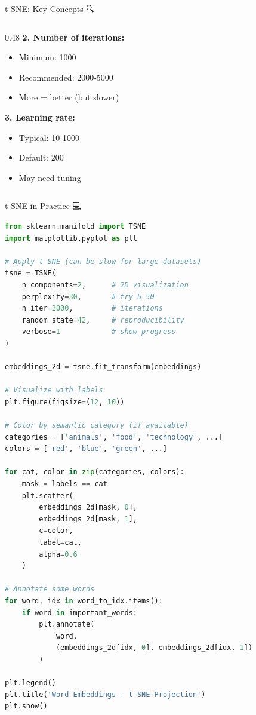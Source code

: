 \documentclass[aspectratio=169]{beamer}
\begin{document}
\begin{frame}[shrink=10]{t-SNE: Key Concepts 🔍}
\begin{columns}[T]
\begin{column}{0.48\textwidth}
\vspace{0.5em}
\textbf{2. Number of iterations:}
\begin{itemize}\setlength{\itemsep}{0pt}
    \item Minimum: 1000
    \item Recommended: 2000-5000
    \item More = better (but slower)
\end{itemize}

\vspace{0.5em}
\textbf{3. Learning rate:}
\begin{itemize}\setlength{\itemsep}{0pt}
    \item Typical: 10-1000
    \item Default: 200
    \item May need tuning
\end{itemize}
\end{column}
\end{columns}
\end{frame}

\begin{frame}[fragile]{t-SNE in Practice 💻}
\begin{lstlisting}[language=Python]
from sklearn.manifold import TSNE
import matplotlib.pyplot as plt

# Apply t-SNE (can be slow for large datasets)
tsne = TSNE(
    n_components=2,      # 2D visualization
    perplexity=30,       # try 5-50
    n_iter=2000,         # iterations
    random_state=42,     # reproducibility
    verbose=1            # show progress
)

embeddings_2d = tsne.fit_transform(embeddings)

# Visualize with labels
plt.figure(figsize=(12, 10))

# Color by semantic category (if available)
categories = ['animals', 'food', 'technology', ...]
colors = ['red', 'blue', 'green', ...]

for cat, color in zip(categories, colors):
    mask = labels == cat
    plt.scatter(
        embeddings_2d[mask, 0],
        embeddings_2d[mask, 1],
        c=color,
        label=cat,
        alpha=0.6
    )

# Annotate some words
for word, idx in word_to_idx.items():
    if word in important_words:
        plt.annotate(
            word,
            (embeddings_2d[idx, 0], embeddings_2d[idx, 1])
        )

plt.legend()
plt.title('Word Embeddings - t-SNE Projection')
plt.show()
\end{lstlisting}
\end{frame}
\end{document}
